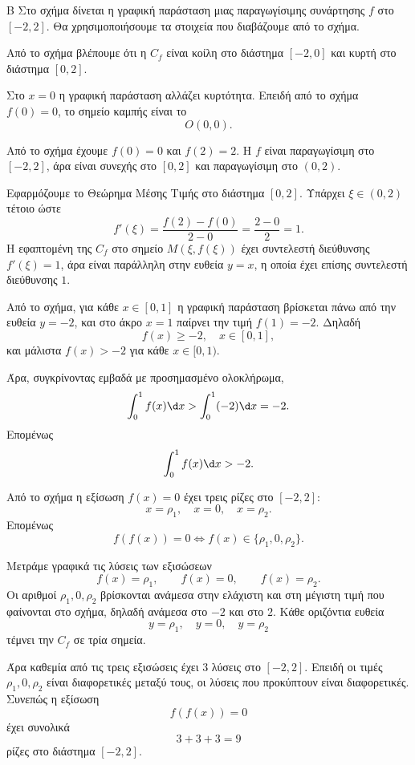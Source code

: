 

\begin{thema}{Β}
Στο σχήμα δίνεται η γραφική παράσταση μιας παραγωγίσιμης συνάρτησης $f$ στο $[-2,2]$. Θα χρησιμοποιήσουμε τα στοιχεία που διαβάζουμε από το σχήμα.

\begin{erwthma}
\item Από το σχήμα βλέπουμε ότι η $C_f$ είναι κοίλη στο διάστημα $[-2,0]$ και κυρτή στο διάστημα $[0,2]$.

Στο $x=0$ η γραφική παράσταση αλλάζει κυρτότητα. Επειδή από το σχήμα $f(0)=0$, το σημείο καμπής είναι το
\[
O(0,0).
\]

\item Από το σχήμα έχουμε $f(0)=0$ και $f(2)=2$. Η $f$ είναι παραγωγίσιμη στο $[-2,2]$, άρα είναι συνεχής στο $[0,2]$ και παραγωγίσιμη στο $(0,2)$.

Εφαρμόζουμε το Θεώρημα Μέσης Τιμής στο διάστημα $[0,2]$. Υπάρχει $\xi\in(0,2)$ τέτοιο ώστε
\[
f'(\xi)=\frac{f(2)-f(0)}{2-0}=\frac{2-0}{2}=1.
\]
Η εφαπτομένη της $C_f$ στο σημείο $M(\xi,f(\xi))$ έχει συντελεστή διεύθυνσης $f'(\xi)=1$, άρα είναι παράλληλη στην ευθεία $y=x$, η οποία έχει επίσης συντελεστή διεύθυνσης $1$.

\item Από το σχήμα, για κάθε $x\in[0,1]$ η γραφική παράσταση βρίσκεται πάνω από την ευθεία $y=-2$, και στο άκρο $x=1$ παίρνει την τιμή $f(1)=-2$. Δηλαδή
\[
f(x)\geq -2,\quad x\in[0,1],
\]
και μάλιστα $f(x)>-2$ για κάθε $x\in[0,1)$.

Άρα, συγκρίνοντας εμβαδά με προσημασμένο ολοκλήρωμα,
\[
\dint_0^1 f(x)\d x>\dint_0^1 (-2)\d x=-2.
\]
Επομένως
\[
\dint_0^1 f(x)\d x>-2.
\]

\item Από το σχήμα η εξίσωση $f(x)=0$ έχει τρεις ρίζες στο $[-2,2]$:
\[
x=\rho_1,\quad x=0,\quad x=\rho_2.
\]
Επομένως
\[
f(f(x))=0
\Leftrightarrow
f(x)\in\{\rho_1,0,\rho_2\}.
\]

Μετράμε γραφικά τις λύσεις των εξισώσεων
\[
f(x)=\rho_1,\qquad f(x)=0,\qquad f(x)=\rho_2.
\]
Οι αριθμοί $\rho_1,0,\rho_2$ βρίσκονται ανάμεσα στην ελάχιστη και στη μέγιστη τιμή που φαίνονται στο σχήμα, δηλαδή ανάμεσα στο $-2$ και στο $2$. Κάθε οριζόντια ευθεία
\[
y=\rho_1,\quad y=0,\quad y=\rho_2
\]
τέμνει την $C_f$ σε τρία σημεία.

Άρα καθεμία από τις τρεις εξισώσεις έχει $3$ λύσεις στο $[-2,2]$. Επειδή οι τιμές $\rho_1,0,\rho_2$ είναι διαφορετικές μεταξύ τους, οι λύσεις που προκύπτουν είναι διαφορετικές. Συνεπώς η εξίσωση
\[
f(f(x))=0
\]
έχει συνολικά
\[
3+3+3=9
\]
ρίζες στο διάστημα $[-2,2]$.
\end{erwthma}
\end{thema}

